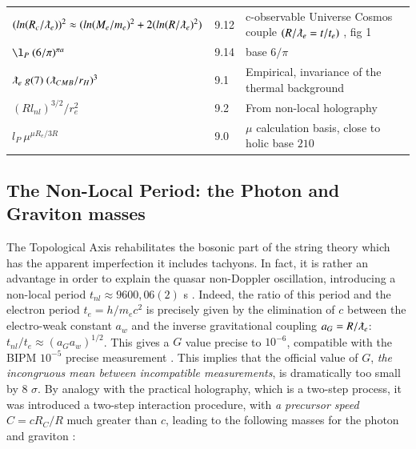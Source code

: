 \documentclass[a4paper,9pt]{article}
\begin{document}
\begin{table}
\begin{tabular}{lll}
 $ (ln(R_c/\lambdabar_e))^2 \approx (ln(M_e/m_e)^2 + 2(ln(R/\lambdabar_e)^2) $ & 9.12 & c-observable Universe  Cosmos couple $(R/\lambdabar_e = t/t_e)$ , fig 1   \\
 
  
  
  $  \l_P ~ (6/\pi)^{\pi a}  $ & 9.14 & base $6/\pi$  \\
  
  
  
 $ \lambdabar_e~ g(7) ~(\lambdabar_{CMB}/r_H)^3 $ & 9.1 & Empirical, invariance of the thermal background \cite{Sanchez2}  \\
 
 $  (Rl_{nl})^{3/2}/r_e^2 $ & 9.2 & From non-local holography \cite{Sanchez2}  \\
 
  $  l_P ~ \mu^{\mu R_e/3R}  $ & 9.0 & $\mu$ calculation basis, close to holic base $210$   \\
  
  
  
 
 \bottomrule
  \end{tabular}
\end{table} 
  
    
     
\subsection{The Non-Local Period: the Photon and Graviton masses}
The Topological Axis rehabilitates the bosonic part of the string theory which has the apparent imperfection it includes tachyons. In fact, it is rather an advantage in order to explain the quasar non-Doppler oscillation, introducing a non-local period $t_{nl} \approx 9600,06 (2) $ s \cite{Kotov}. Indeed, the ratio of this period and the electron period $t_e = h/m_ec^2$ is precisely given by the elimination of $c$ between the electro-weak constant $a_w$ and the inverse gravitational coupling $a_G = R/\lambdabar_e $: $t_{nl} /t_e   \approx  (a_G a_w)^{1/2}$. This gives a $G$ value precise to $10^{-6}$, compatible with the BIPM $10^{-5}$ precise measurement \cite {Quinn}. This implies that the official value of $G$, \textit{the incongruous mean between incompatible measurements}, is dramatically too small by 8 $\sigma$. By analogy with the practical holography, which is a two-step process, it was introduced a two-step interaction procedure, with \textit{a precursor speed} $C = cR_C/R$ much greater than $c$, leading to the following masses for the photon and graviton \cite{Sanchez2}:
\end{document}
